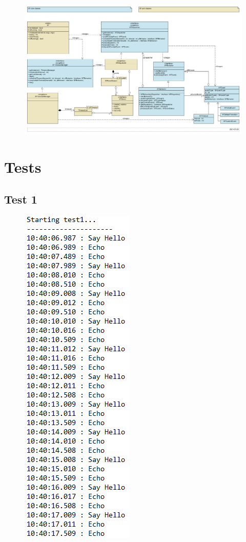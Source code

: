 \documentclass[11pt,titlepage]{report}
\begin{document}
\begin{figure}[H]
	\centering
	\includegraphics[angle=90, height=\textheight]{Images/xf/cmd-simple-xf.png}
\end{figure}

\chapter{Tests}
\section{Test 1}
\begin{figure}[H]
	\centering
	\includegraphics[]{Images/tests/test1.PNG}
\end{figure}
\end{document}
